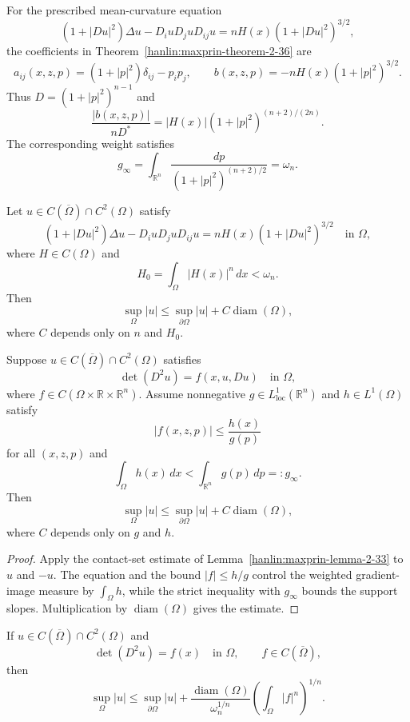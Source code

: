 \begin{example}\label{hanlin:maxprin-example-2-37}
For the prescribed mean-curvature equation
\[
(1+|Du|^2)\Delta u-D_iuD_juD_{ij}u
=nH(x)(1+|Du|^2)^{3/2},
\]
the coefficients in Theorem~\ref{hanlin:maxprin-theorem-2-36} are
\[
a_{ij}(x,z,p)=(1+|p|^2)\delta_{ij}-p_ip_j,
\qquad
b(x,z,p)=-nH(x)(1+|p|^2)^{3/2}.
\]
Thus $D=(1+|p|^2)^{n-1}$ and
\[
\frac{|b(x,z,p)|}{nD^*}
=|H(x)|(1+|p|^2)^{(n+2)/(2n)}.
\]
The corresponding weight satisfies
\[
g_\infty=\int_{\mathbb R^n}\frac{dp}{(1+|p|^2)^{(n+2)/2}}
=\omega_n.
\]
\end{example}

\begin{corollary}\label{hanlin:maxprin-cor-2-38}
Let $u\in C(\overline\Omega)\cap C^2(\Omega)$ satisfy
\[
(1+|Du|^2)\Delta u-D_iuD_juD_{ij}u
=nH(x)(1+|Du|^2)^{3/2}
\quad\text{in }\Omega,
\]
where $H\in C(\Omega)$ and
\[
H_0=\int_\Omega|H(x)|^n\,dx<\omega_n.
\]
Then
\[
\sup_\Omega|u|\le\sup_{\partial\Omega}|u|
+C\operatorname{diam}(\Omega),
\]
where $C$ depends only on $n$ and $H_0$.
\end{corollary}

\begin{theorem}\label{hanlin:maxprin-theorem-2-39}
Suppose $u\in C(\overline\Omega)\cap C^2(\Omega)$ satisfies
\[
\det(D^2u)=f(x,u,Du)
\quad\text{in }\Omega,
\]
where $f\in C(\Omega\times\mathbb R\times\mathbb R^n)$. Assume nonnegative
$g\in L^1_{\mathrm{loc}}(\mathbb R^n)$ and $h\in L^1(\Omega)$ satisfy
\[
|f(x,z,p)|\le\frac{h(x)}{g(p)}
\]
for all $(x,z,p)$ and
\[
\int_\Omega h(x)\,dx
<\int_{\mathbb R^n}g(p)\,dp=:g_\infty.
\]
Then
\[
\sup_\Omega|u|\le\sup_{\partial\Omega}|u|
+C\operatorname{diam}(\Omega),
\]
where $C$ depends only on $g$ and $h$.
\end{theorem}
\begin{proof}
\sketch Apply the contact-set estimate of
Lemma~\ref{hanlin:maxprin-lemma-2-33} to $u$ and $-u$. The equation and the
bound $|f|\le h/g$ control the weighted gradient-image measure by
$\int_\Omega h$, while the strict inequality with $g_\infty$ bounds the support
slopes. Multiplication by $\operatorname{diam}(\Omega)$ gives the estimate.
\end{proof}

\begin{corollary}\label{hanlin:maxprin-cor-2-40}
If $u\in C(\overline\Omega)\cap C^2(\Omega)$ and
\[
\det(D^2u)=f(x)\quad\text{in }\Omega,
\qquad f\in C(\overline\Omega),
\]
then
\[
\sup_\Omega|u|\le\sup_{\partial\Omega}|u|
+\frac{\operatorname{diam}(\Omega)}{\omega_n^{1/n}}
\left(\int_\Omega|f|^n\right)^{1/n}.
\]
\end{corollary}

